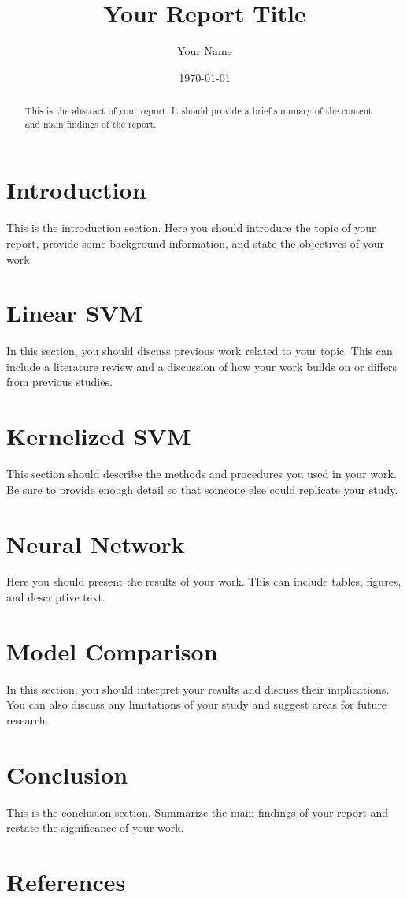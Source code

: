 \documentclass[12pt]{article}
\title{Your Report Title}
\author{Your Name}
\date{\today}
\begin{document}
\maketitle

\begin{abstract}
This is the abstract of your report. It should provide a brief summary of the content and main findings of the report.
\end{abstract}

\section{Introduction}
This is the introduction section. Here you should introduce the topic of your report, provide some background information, and state the objectives of your work.

\section{Linear SVM }
In this section, you should discuss previous work related to your topic. This can include a literature review and a discussion of how your work builds on or differs from previous studies.

\section{Kernelized SVM}
This section should describe the methods and procedures you used in your work. Be sure to provide enough detail so that someone else could replicate your study.

\section{Neural Network}
Here you should present the results of your work. This can include tables, figures, and descriptive text.

\section{Model Comparison}
In this section, you should interpret your results and discuss their implications. You can also discuss any limitations of your study and suggest areas for future research.

\section{Conclusion}
This is the conclusion section. Summarize the main findings of your report and restate the significance of your work.

\section{References}


\end{document}
